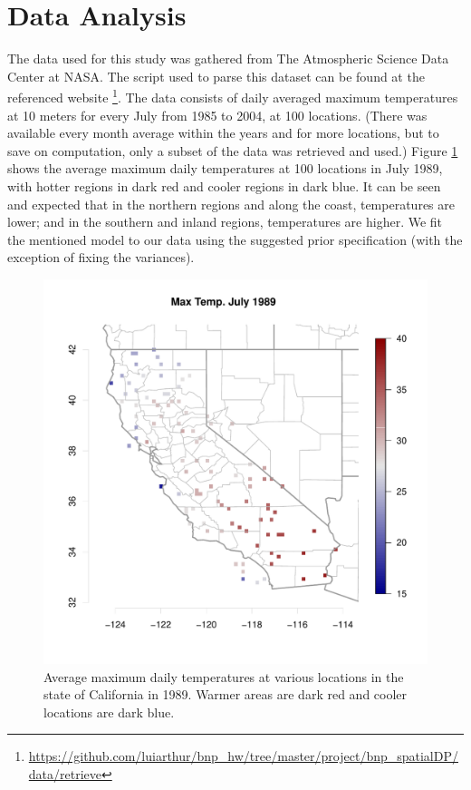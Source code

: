 \documentclass[11pt]{article}
\def\beginmyfig{\begin{figure}[h]\center}
\def\endmyfig{\end{figure}}
\begin{document}
\section{Data Analysis}
The data used for this study was gathered from The Atmospheric Science Data
Center at NASA. The script used to parse this dataset can be found at the
referenced website
\footnote{\url{https://github.com/luiarthur/bnp_hw/tree/master/project/bnp_spatialDP/data/retrieve}}.
The data consists of daily averaged maximum temperatures at 10 meters for every
July from 1985 to 2004, at 100 locations. (There was available every month
average within the years and for more locations, but to save on computation,
only a subset of the data was retrieved and used.) Figure \ref{fig:dat} shows
the average maximum daily temperatures at 100 locations in July 1989, with
hotter regions in dark red and cooler regions in dark blue. It can be seen and expected that
in the northern regions and along the coast, temperatures are lower; and in the
southern and inland regions, temperatures are higher. We fit the mentioned model
to our data using the suggested prior specification (with the exception of 
fixing the variances).\\
\beginmyfig 
  \includegraphics[scale=.6]{../graphs/july1989.pdf} 
  \caption{Average maximum daily temperatures at various locations in the state of California in 1989. 
  Warmer areas are dark red and cooler locations are dark blue.}
  \label{fig:dat}
\endmyfig
\end{document}
